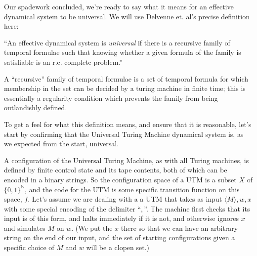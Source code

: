 \documentclass{fkpaper}
\renewcommand{\Nn}{\mathbb{N}}
\begin{document}
\begin{multicols}{2}
Our spadework concluded, we're ready to say what it means for an effective dynamical system to be universal. We will use Delvenne et. al's precise definition here:

\begin{definition}[universality]

	``An effective dynamical system is \emph{universal} if there is a recursive family of temporal formulae such that knowing whether a given formula of the family is satisfiable is an r.e.-complete problem.''
\end{definition}

A ``recursive'' family of temporal formulae is a set of temporal formula for which membership in the set can be decided by a turing machine in finite time; this is essentially a regularity condition which prevents the family from being outlandishly defined.

To get a feel for what this definition means, and ensure that it is reasonable, let's start by confirming that the Universal Turing Machine dynamical system  is, as we expected from the start, universal.

A configuration of the Universal Turing Machine, as with all Turing machines, is defined by finite control state and its tape contents, both of which can be encoded in a binary strings. So the configuration space of a UTM is a subset $X$ of $\{0,1\}^\Nn$, and the code for the UTM is some specific transition function on this space, $f$. Let's assume we are dealing with a a UTM that takes as input $\langle M \rangle, w, x$ with some special encoding of the delimiter ``$,$''. The machine first checks that its input is of this form, and halts immediately if it is not, and otherwise ignores $x$ and simulates $M$ on $w$. (We put the $x$ there so that we can have an arbitrary string on the end of our input, and the set of starting configurations given a specific choice of $M$ and $w$ will be a clopen set.)


\end{multicols}
\end{document}
